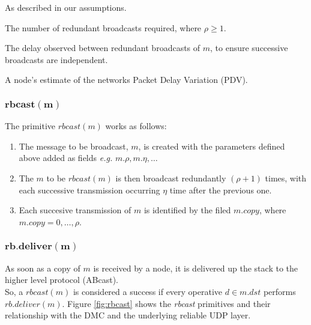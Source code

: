     \begin{description}[leftmargin=1cm, labelindent=1cm]
        \item[$\bm{x_{mx}}$ \textnormal{and}  $\bm{q}$ - ]    As described in our assumptions.
        
        \item[$\bm{\rho}$ - ]    The number of redundant broadcasts required, where $\rho \geq 1$.
        
        \item[$\bm{\eta}$ - ]    The delay observed between redundant broadcasts of $m$, to ensure successive broadcasts are independent.  
        
        \item[$\bm{\omega}$ - ]    A node's estimate of the networks Packet Delay Variation (PDV).  
        \end{description}
    
    \subsubsection*{$\bm{rbcast(m)}$}
    The primitive $rbcast(m)$ works as follows:
    \begin{enumerate}[label=\roman*]
        \item    The message to be broadcast, $m$, is created with the parameters defined above added as fields \emph{e.g.} $m.\rho, m.\eta, \ldots$ 
        
        \item    The $m$ to be $rbcast(m)$ is then broadcast redundantly $(\rho + 1)$ times, with each successive transmission occurring $\eta$ time after the previous one.  
        
        \item    Each succesive transmission of $m$ is identified by the filed $m.copy$, where $m.copy = 0, \ldots, \rho$.  
    \end{enumerate}
    
     \subsubsection*{$\bm{rb.deliver(m)}$}
     As soon as a copy of $m$ is received by a node, it is delivered up the stack to the higher level protocol (\textsf{ABcast}).  \\
     
    So, a $rbcast(m)$ is considered a success if every operative $d \in m.dst$ performs $rb.deliver(m)$.  Figure \ref{fig:rbcast} shows the \emph{rbcast} primitives and their relationship with the DMC and the underlying reliable UDP layer.  
    
